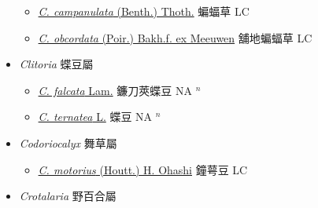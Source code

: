 \begin{itemize}
  \begin{itemize}
        \item[] \href{http://www.theplantlist.org/tpl1.1/search?q=Christia+campanulata}{\textit{C. campanulata} (Benth.) Thoth.}   蝙蝠草 LC
        \item[] \href{http://www.theplantlist.org/tpl1.1/search?q=Christia+obcordata}{\textit{C. obcordata} (Poir.) Bakh.f. ex Meeuwen}   舖地蝙蝠草 LC
  \end{itemize}
 \item[] \textit{Clitoria} 蝶豆屬
                    
  \begin{itemize}
        \item[] \href{http://www.theplantlist.org/tpl1.1/search?q=Clitoria+falcata}{\textit{C. falcata} Lam.}   鐮刀莢蝶豆 NA $^n$
        \item[] \href{http://www.theplantlist.org/tpl1.1/search?q=Clitoria+ternatea}{\textit{C. ternatea} L.}   蝶豆 NA $^n$
  \end{itemize}
 \item[] \textit{Codoriocalyx} 舞草屬
                    
  \begin{itemize}
        \item[] \href{http://www.theplantlist.org/tpl1.1/search?q=Codoriocalyx+motorius}{\textit{C. motorius} (Houtt.) H. Ohashi}   鐘萼豆 LC
  \end{itemize}
 \item[] \textit{Crotalaria} 野百合屬
                    

\end{itemize}
